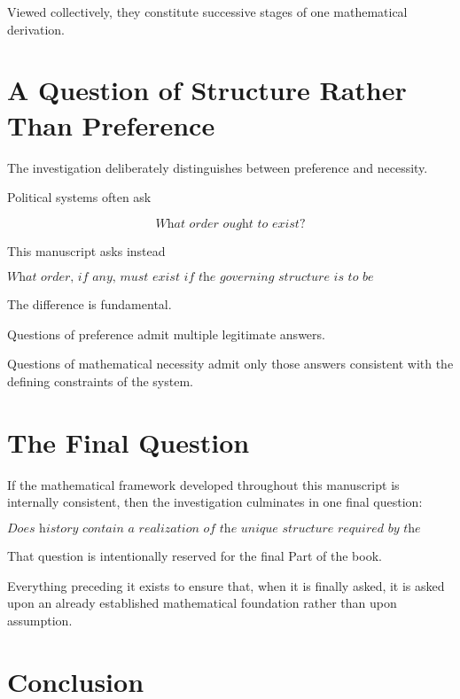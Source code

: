 \documentclass[11pt,openany]{book}
\theoremstyle{plain}
\theoremstyle{definition}
\begin{document}
Viewed collectively, they constitute successive stages of one mathematical derivation.


\section*{A Question of Structure Rather Than Preference}

The investigation deliberately distinguishes between preference and necessity.

Political systems often ask

\[
\textit{
What order ought to exist?
}
\]

This manuscript asks instead

\[
\boxed{
\textit{
What order, if any, must exist if the governing structure is to be mathematically complete?
}
}
\]

The difference is fundamental.

Questions of preference admit multiple legitimate answers.

Questions of mathematical necessity admit only those answers consistent with the defining constraints of the system.


\section*{The Final Question}

If the mathematical framework developed throughout this manuscript is internally consistent, then the investigation culminates in one final question:

\[
\boxed{
\textit{
Does history contain a realization of the unique structure required by the completed mathematical model?
}
}
\]

That question is intentionally reserved for the final Part of the book.

Everything preceding it exists to ensure that, when it is finally asked, it is asked upon an already established mathematical foundation rather than upon assumption.


\section*{Conclusion}
\end{document}
